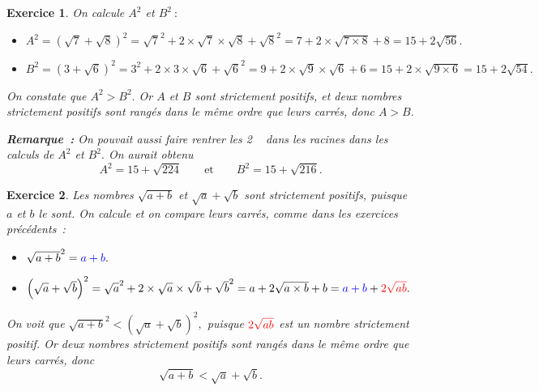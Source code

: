 \documentclass[10pt]{article}
\newtheorem{exo}{Exercice}
\begin{document}
\begin{exo}

On calcule $A^2$ et $B^2~:$

\medskip

\begin{itemize}
\item[\textbullet] $A^2=\left(\sqrt{7}+\sqrt{8}\right)^2=\sqrt{7}^2+2\times\sqrt{7}\times\sqrt{8}+\sqrt{8}^2=7+2\times\sqrt{7\times 8}+8=15+2\sqrt{56}.$
\item[\textbullet] $B^2=\left(3+\sqrt{6}\right)^2=3^2+2\times 3\times \sqrt{6}+\sqrt{6}^2=9+2\times \sqrt{9}\times\sqrt{6}+6=15+2\times\sqrt{9\times 6}=15+2\sqrt{54}.$
\end{itemize}

\medskip

On constate que $A^2>B^2.$ Or $A$ et $B$ sont strictement positifs, et deux nombres strictement positifs sont rangés dans le même ordre que leurs carrés, donc $A>B.$


\medskip

\textbf{Remarque~:} On pouvait aussi \og faire rentrer les 2 \fg~{} dans les racines dans les calculs de $A^2$ et $B^2.$ On aurait obtenu
\[A^2=15+\sqrt{224}\qquad\text{et}\qquad B^2=15+\sqrt{216}.\]


\end{exo}

\begin{exo}

Les nombres $\sqrt{a+b}$ et $\sqrt{a}+\sqrt{b}$ sont strictement positifs, puisque $a$ et $b$ le sont. On calcule et on compare leurs carrés, comme dans les exercices précédents~:

\medskip

\begin{itemize}
\item[\textbullet] $\sqrt{a+b}^2=\textcolor{blue}{a+b}.$
\item[\textbullet] $\left(\sqrt{a}+\sqrt{b}\right)^2=\sqrt{a}^2+2\times\sqrt{a}\times\sqrt{b}+\sqrt{b}^2=a+2\sqrt{a\times b}+b=\textcolor{blue}{a+b}+\textcolor{red}{2\sqrt{ab}}.$
\end{itemize}
On voit que $\sqrt{a+b}^2<\left(\sqrt{a}+\sqrt{b}\right)^2,$ puisque $\textcolor{red}{2\sqrt{ab}}$ est un nombre strictement positif. Or deux nombres strictement positifs sont rangés dans le même ordre que leurs carrés, donc 
\[\sqrt{a+b}<\sqrt{a}+\sqrt{b}.\]



\end{exo}
\end{document}
